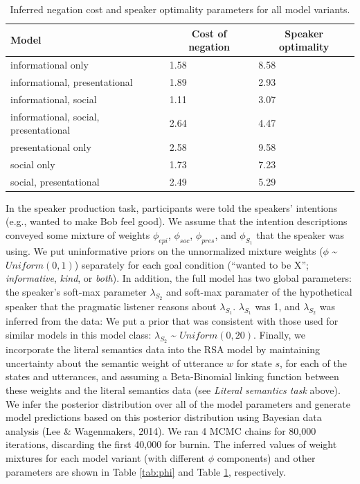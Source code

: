 \documentclass[12pt]{article}
\begin{document}
\begin{table}[tbp]
\begin{center}
\begin{threeparttable}
\caption{\label{tab:otherParams}Inferred negation cost and speaker optimality parameters for all model variants.}
\begin{tabular}{lll}
\toprule
Model & \multicolumn{1}{c}{Cost of negation} & \multicolumn{1}{c}{Speaker optimality}\\
\midrule
informational only & 1.58 & 8.58\\
informational, presentational & 1.89 & 2.93\\
informational, social & 1.11 & 3.07\\
informational, social, presentational & 2.64 & 4.47\\
presentational only & 2.58 & 9.58\\
social only & 1.73 & 7.23\\
social, presentational & 2.49 & 5.29\\
\bottomrule
\end{tabular}
\end{threeparttable}
\end{center}
\end{table}

In the speaker production task, participants were told the speakers'
intentions (e.g., wanted to make Bob feel good). We assume that the
intention descriptions conveyed some mixture of weights \(\phi_{epi}\),
\(\phi_{soc}\), \(\phi_{pres}\), and \(\phi_{S_1}\) that the speaker was
using. We put uninformative priors on the unnormalized mixture weights
(\(\phi\) \textasciitilde{} \(Uniform(0,1)\)) separately for each goal
condition (\enquote{wanted to be X}; \emph{informative}, \emph{kind}, or
\emph{both}). In addition, the full model has two global parameters: the
speaker's soft-max parameter \(\lambda_{S_2}\) and soft-max paramater of
the hypothetical speaker that the pragmatic listener reasons about
\(\lambda_{S_1}\). \(\lambda_{S_1}\) was 1, and \(\lambda_{S_2}\) was
inferred from the data: We put a prior that was consistent with those
used for similar models in this model class: \(\lambda_{S_2}\)
\textasciitilde{} \(Uniform(0,20)\). Finally, we incorporate the literal
semantics data into the RSA model by maintaining uncertainty about the
semantic weight of utterance \(w\) for state \(s\), for each of the
states and utterances, and assuming a Beta-Binomial linking function
between these weights and the literal semantics data (see \emph{Literal
semantics task} above). We infer the posterior distribution over all of
the model parameters and generate model predictions based on this
posterior distribution using Bayesian data analysis (Lee \& Wagenmakers,
2014). We ran 4 MCMC chains for 80,000 iterations, discarding the first
40,000 for burnin. The inferred values of weight mixtures for each model
variant (with different \(\phi\) components) and other parameters are
shown in Table \ref{tab:phi} and Table \ref{tab:otherParams},
respectively.
\end{document}
